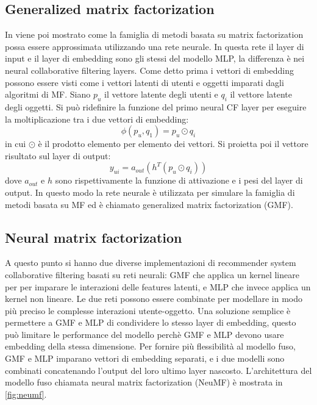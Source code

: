 \documentclass[12pt,italian]{report}
\begin{document}
\subsection{Generalized matrix factorization}
In \cite{NCF} viene poi mostrato come la famiglia di metodi basata su matrix factorization possa essere approssimata utilizzando una rete neurale. In questa rete il layer di input e il layer di embedding sono gli stessi del modello MLP, la differenza è nei neural collaborative filtering layers. Come detto prima i vettori di embedding possono essere visti come i vettori latenti di utenti e oggetti imparati dagli algoritmi di MF. Siano $p_u$ il vettore latente degli utenti e $q_i$ il vettore latente degli oggetti. Si può ridefinire la funzione del primo neural CF layer per eseguire la moltiplicazione tra i due vettori di embedding:
$$
\phi(p_u, q_1) = p_u \odot q_i
$$
in cui $\odot$ è il prodotto elemento per elemento dei vettori. Si proietta poi il vettore risultato sul layer di output:
$$
y_{ui} = a_{out}(h^T(p_u \odot q_i))
$$
dove $a_{out}$ e $h$ sono rispettivamente la funzione di attivazione e  i pesi del layer di output. In questo modo la rete neurale è utilizzata per simulare la famiglia di metodi basata su MF ed è chiamato generalized matrix factorization (GMF).

\subsection{Neural matrix factorization}
A questo punto si hanno due diverse implementazioni di recommender system collaborative filtering basati su reti neurali: GMF che applica un kernel lineare per per imparare le interazioni delle features latenti, e MLP che invece applica un kernel non lineare. Le due reti possono essere combinate per modellare in modo più preciso le complesse interazioni utente-oggetto. Una soluzione semplice è permettere a GMF e MLP di condividere lo stesso layer di embedding, questo può limitare le performance del modello perchè GMF e MLP devono usare embedding della stessa dimensione. Per fornire più flessibilità al modello fuso, GMF e MLP imparano vettori di embedding separati, e i due modelli sono combinati concatenando l'output del loro ultimo layer nascosto. L'architettura del modello fuso chiamata neural matrix factorization (NeuMF) è mostrata in \autoref{fig:neumf}.
\end{document}
